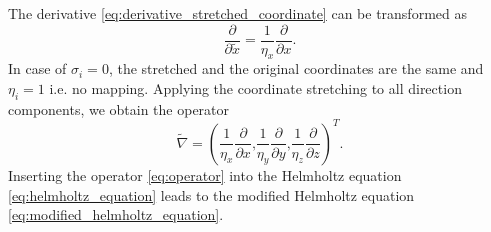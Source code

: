 The derivative \cref{eq:derivative_stretched_coordinate} can be transformed as
\begin{equation}
	\frac{\partial}{\partial \tilde{x}} = \frac{1}{\eta_x}\frac{\partial}{\partial x}\text{.}
\end{equation}
In case of $\sigma_i = 0$, the stretched and the original coordinates are the same and $\eta_i = 1$ i.e. no mapping. Applying the coordinate stretching to all direction components, we obtain the operator
\begin{equation}
	\tilde{\nabla} = \left(\frac{1}{\eta_x}\frac{\partial}{\partial x}\text{,}\frac{1}{\eta_y}\frac{\partial}{\partial y}\text{,}\frac{1}{\eta_z}\frac{\partial}{\partial z} \right)^T \text{.} \label{eq:operator}
\end{equation}
Inserting the operator \cref{eq:operator} into the Helmholtz equation \cref{eq:helmholtz_equation} leads to the modified Helmholtz equation \cref{eq:modified_helmholtz_equation}.

